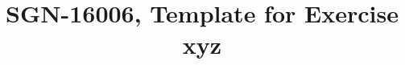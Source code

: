 \documentclass{article}
\title{SGN-16006, Template for Exercise xyz}
\begin{document}
\maketitle
\sloppy








\small






\vfill\pagebreak
\end{document}
